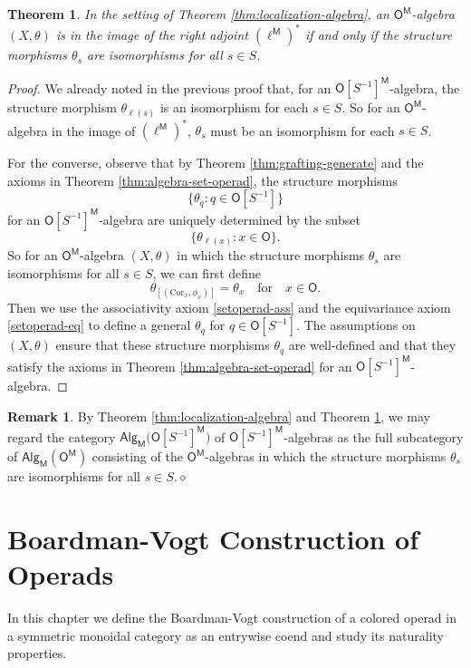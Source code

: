 \documentclass{amsbook}
\numberwithin{section}{chapter}
\numberwithin{subsection}{section}
\numberwithin{equation}{section}
\theoremstyle{plain}
\newtheorem{theorem}[equation]{Theorem}
\theoremstyle{definition}
\newtheorem{remark}[equation]{Remark}
\newcommand{\Cor}{\mathrm{Cor}}
\newcommand{\M}{\mathsf{M}}
\renewcommand{\O}{\mathsf{O}}
\newcommand{\Otom}{\O^{\M}}
\newcommand{\ellm}{\ell^{\M}}
\newcommand{\ellmstar}{(\ellm)^*}
\newcommand{\dqed}{\hfill$\diamond$}
\newcommand{\inv}[1]{{#1}^{-1}}
\newcommand{\Sinv}{\inv{S}}
\newcommand{\Osinv}{\O[\Sinv]}
\newcommand{\Osinvtom}{\Osinv^{\M}}
\newcommand{\Osinvm}{\Osinvtom}
\newcommand{\alg}{\mathsf{Alg}}
\newcommand{\algm}{\alg_{\M}}
\newcommand{\algmotom}{\algm(\Otom)}
\newcommand{\algmosinvtom}{\algm\bigl(\Osinvtom\bigr)}
\newcommand{\forspace}{\quad\text{for}\quad}
\begin{document}
\begin{theorem}\label{osinvm-algebra}
In the setting of Theorem \ref{thm:localization-algebra}, an $\Otom$-algebra $(X,\theta)$ is in the image of the right adjoint $\ellmstar$ if and only if the structure morphisms $\theta_s$ are isomorphisms for all $s \in S$.
\end{theorem}

\begin{proof}
We already noted in the previous proof that, for an $\Osinvm$-algebra, the structure morphism  $\theta_{\ell(s)}$ is an isomorphism for each $s \in S$.  So for an $\Otom$-algebra in the image of $\ellmstar$, $\theta_s$ must be an isomorphism for each $s \in S$.  

For the converse, observe that by Theorem \ref{thm:grafting-generate} and the axioms in Theorem \ref{thm:algebra-set-operad}, the structure morphisms \[\bigl\{\theta_q : q \in \Osinv\bigr\}\] for an $\Osinvm$-algebra are uniquely determined by the subset \[\bigl\{\theta_{\ell(x)} : x \in \O\bigr\}.\]  So for an $\Otom$-algebra $(X,\theta)$ in which the structure morphisms $\theta_s$ are isomorphisms for all $s \in S$, we can first define 
\[\theta_{[(\Cor_x,\phi_x)]} = \theta_x \forspace x\in\O.\]  Then we use the associativity axiom \eqref{setoperad-ass} and the equivariance axiom \eqref{setoperad-eq} to define a general $\theta_q$ for $q \in \Osinv$.  The assumptions on $(X,\theta)$ ensure that these structure morphisms $\theta_q$ are well-defined and that they satisfy the axioms in Theorem \ref{thm:algebra-set-operad} for an $\Osinvm$-algebra.
\end{proof}

\begin{remark}\label{rk:osinvm-algebras}
By Theorem \ref{thm:localization-algebra} and Theorem \ref{osinvm-algebra}, we may regard the category $\algmosinvtom$ of $\Osinvm$-algebras as the full subcategory of $\algmotom$ consisting of the $\Otom$-algebras in which the structure morphisms $\theta_s$ are isomorphisms for all $s \in S$.\dqed\end{remark}


\chapter{Boardman-Vogt Construction of Operads}\label{ch:bv}

In this chapter we define the Boardman-Vogt construction of a colored operad in a symmetric monoidal category as an entrywise coend and study its naturality properties.  
\end{document}
